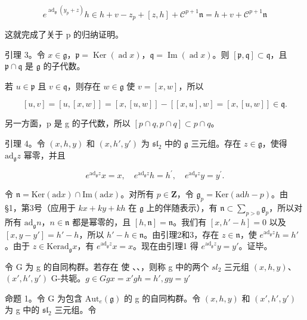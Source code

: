 \[
e ^ {\operatorname{ad} _ {\mathfrak {g}} \left(y _ {p} + z\right)} h \in h + v - z _ {p} + [ z, h ] + \mathscr {C} ^ {p + 1} \mathfrak {n} = h + v + \mathscr {C} ^ {p + 1} \mathfrak {n}
\]

这就完成了关于 p 的归纳证明。

引理 3。令 \(x \in \mathfrak{g}\)，\(\mathfrak{p} = \operatorname{Ker}(\operatorname{ad}x)\)，\(\mathfrak{q} = \operatorname{Im}(\operatorname{ad}x)\)。则 \([\mathfrak{p}, \mathfrak{q}] \subset \mathfrak{q}\)，且 \(\mathfrak{p} \cap \mathfrak{q}\) 是 \(\mathfrak{g}\) 的子代数。

若 \(u \in \mathfrak{p}\) 且 \(v \in \mathfrak{q}\)，则存在 \(w \in \mathfrak{g}\) 使 \(v = [x, w]\)，所以

\[
[ u, v ] = [ u, [ x, w ] ] = [ x, [ u, w ] ] - [ [ x, u ], w ] = [ x, [ u, w ] ] \in \mathfrak {q}.
\]

另一方面，p 是 g 的子代数，所以 \([p \cap q, p \cap q] \subset p \cap q\)。

引理 4。令 \((x,h,y)\) 和 \((x,h',y')\) 为 \(\mathfrak{sl}_2\) 中的 \(\mathfrak{g}\) 三元组。存在 \(z\in \mathfrak{g}\)，使得 \(\mathrm{ad}_{\mathfrak{g}}z\) 幂零，并且

\[
e ^ {\mathrm{ad} _ {\mathfrak {g}} z} x = x, \quad e ^ {\mathrm{ad} _ {\mathfrak {g}} z} h = h ^ {\prime}, \quad e ^ {\mathrm{ad} _ {\mathfrak {g}} z} y = y ^ {\prime}.
\]

令 \(\mathfrak{n} = \mathrm{Ker}(\mathrm{ad} x) \cap \mathrm{Im}(\mathrm{ad} x)\)。对所有 \(p \in \mathbf{Z}\)，令 \(\mathfrak{g}_p = \mathrm{Ker}(\mathrm{ad} h - p)\)。由 §1，第3号（应用于 \(kx + ky + kh\) 在 \(\mathfrak{g}\) 上的伴随表示），有 \(\mathfrak{n} \subset \sum_{p > 0} \mathfrak{g}_p\)，所以对所有 \(\mathrm{ad}_{\mathfrak{g}} n\)，\(n \in \mathfrak{n}\) 都是幂零的，且 \([h, \mathfrak{n}] = \mathfrak{n}\)。我们有 \([x, h' - h] = 0\) 以及 \([x, y - y'] = h' - h\)，所以 \(h' - h \in \mathfrak{n}\)。由引理2和3，存在 \(z \in \mathfrak{n}\)，使 \(e^{\mathrm{ad}_{\mathfrak{g}} z} h = h'\)。由于 \(z \in \mathrm{Ker} \mathrm{ad}_{\mathfrak{g}} x\)，有 \(e^{\mathrm{ad}_{\mathfrak{g}} z} x = x\)。现在由引理1 得 \(e^{\mathrm{ad}_{\mathfrak{g}} z} y = y'\)。证毕。

令 G 为 g 的自同构群。若存在  使 、、，则称 g 中的两个 \(sl_{2}\) 三元组 \((x,h,y)\)、\((x',h',y')\) G-共轭。\(g\in G\)\(gx=x'\)\(gh=h',gy=y'\)

命题 1。令 G 为包含 \(\mathrm{Aut}_e(\mathfrak{g})\) 的 g 的自同构群。令 \((x,h,y)\) 和 \((x',h',y')\) 为 g 中的 \(\mathfrak{sl}_2\) 三元组。令

